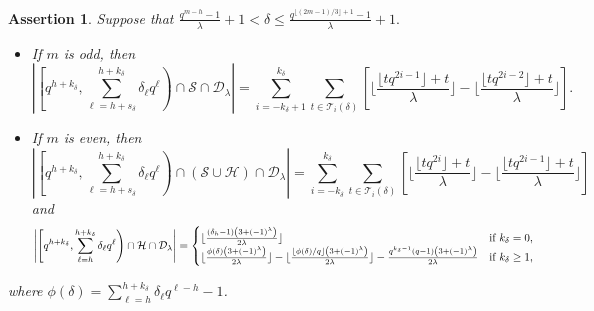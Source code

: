 \documentclass[journal,onecolumn]{IEEEtran}
\newtheorem{assertion}{Assertion}
\begin{document}
\begin{assertion}\label{as4}
 Suppose that  $ \frac{q^{m-h}-1}{\lambda}+1<\delta\leq  \frac{q^{\lfloor (2m-1)/3\rfloor+1}-1}{\lambda}+1.$    
    \begin{itemize}
 \item   If $m$ is odd, then 
\begin{equation}\label{as2e}
        \left|\left[q^{h+k_{\delta}}, \sum\limits_{\ell=h+s_{\delta}}^{h+k_{\delta}}
        \delta_{\ell}q^{\ell}\right)\cap \mathcal{S}\cap \mathcal{D}_{\lambda}\right|=\sum\limits_{i=-k_{\delta}+1}^{k_{\delta}}\sum\limits_{t\in \mathcal{T}_i(\delta)} \left [\lfloor \frac{\lfloor tq^{2i-1}\rfloor+t}{\lambda}\rfloor -\lfloor \frac{\lfloor tq^{2i-2}\rfloor+t}{\lambda}\rfloor \right]. 
    \end{equation} 
\item If $m$ is even, then 
\begin{equation}\label{as2e2}
        \left|\left[q^{h+k_{\delta}}, \sum\limits_{\ell=h+s_{\delta}}^{h+k_{\delta}}
        \delta_{\ell}q^{\ell}\right)\cap (\mathcal{S}\cup \mathcal{H})\cap \mathcal{D}_{\lambda}\right|=\sum\limits_{i=-k_{\delta}}^{k_{\delta}}\sum\limits_{t\in {\mathcal{T}}_i(\delta)}\left[\lfloor \frac{\lfloor tq^{2i}\rfloor+t}{\lambda}\rfloor -\lfloor \frac{\lfloor tq^{2i-1}\rfloor+t}{\lambda}\rfloor  \right]
    \end{equation} 
    and 
    \begin{equation}\label{as2e3} 
        \left|\left[q^{h+k_{\delta}}, \sum\limits_{\ell=h}^{h+k_{\delta}}
        \delta_{\ell}q^{\ell}\right)\cap  \mathcal{H} \cap \mathcal{D}_{\lambda}\right|= \begin{cases}
            \lfloor \frac{(\delta_h-1)\left(3+(-1)^{\lambda}
            \right)}{2\lambda} \rfloor &\hbox{if }k_{\delta}=0, \\
        \lfloor  \frac{\phi(\delta)\left(3+(-1)^{\lambda}
            \right)}{2\lambda} \rfloor -\lfloor  \frac{\lfloor \phi(\delta)/q \rfloor\left(3+(-1)^{\lambda}
            \right) }{2\lambda}   \rfloor  -\frac{q^{k_{\delta}-1}(q-1)\left(3+(-1)^{\lambda}
            \right)}{2\lambda} &\hbox{if }k_{\delta}\geq 1,
        \end{cases}
    \end{equation} 
 \end{itemize}
where $\phi(\delta)=\sum\limits_{\ell=h}^{h+k_{\delta}}\delta_{\ell}q^{\ell-h}-1$.
 \end{assertion}
\end{document}
